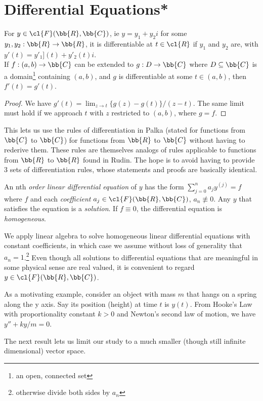 \section{Differential Equations*}
\begin{lem}
For $y \in \cl{F}(\bb{R},\bb{C})$, ie $y=y_1+y_2i$ for some $y_1,y_2: \bb{R}\to \bb{R}$, it is differentiable at $t \in \cl{R}$ if $y_1$ and $y_2$ are, with $y'(t)=y'_1](t)+y'_2(t)i$.\\
If $f:(a,b)\to \bb{C}$ can be extended to $g:D \to \bb{C}$ where $D \subseteq \bb{C}$ is a domain\footnote{an open, connected set} containing $(a,b)$, and $g$ is differentiable at some $t \in (a,b)$, then $f'(t)=g'(t)$.
\end{lem}
\begin{proof}
We have $g'(t)= \lim_{z \to t}\{ g(z)-g(t) \}/(z-t)$. The same limit must hold if we approach $t$ with $z$ restricted to $(a,b)$, where $g=f$.
\end{proof}
This lets us use the rules of differentiation in Palka (stated for functions from $\bb{C}$ to $\bb{C}$) for functions from $\bb{R}$ to $\bb{C}$ without having to rederive them. These rules are themselves analogs of rules applicable to functions from $\bb{R}$ to $\bb{R}$ found in Rudin.
The hope is to avoid having to provide 3 sets of differentiation rules, whose statements and proofs are basically identical.
\begin{defn}
An nth \emph{order linear differential equation} of $y$ has the form $\sum_{j=0}^na_jy^{(j)}=f$ where $f$ and each \emph{coefficient} $a_j \in \cl{F}(\bb{R},\bb{C})$, $a_n \not\equiv 0$. Any $y$ that satisfies the equation is a \emph{solution}. If $f \equiv 0$, the differential equation is \emph{homogeneous}.
\end{defn}
We apply linear algebra to solve homogeneous linear differential equations with constant coefficients, in which case we assume without loss of generality that $a_n=1$.\footnote{otherwise divide both sides by $a_n$}
Even though all solutions to differential equations that are meaningful in some physical sense are real valued, it is convenient to regard $y \in \cl{F}(\bb{R},\bb{C})$.
\begin{example}
As a motivating example, consider an object with mass $m$ that hangs on a spring along the y axis. Say its position (height) at time $t$ is $y(t)$. From Hooke's Law with proportionality constant $k>0$ and Newton's second law of motion, we have $y''+ky/m=0$.
\end{example}
The next result lets us limit our study to a much smaller (though still infinite dimensional) vector space.
